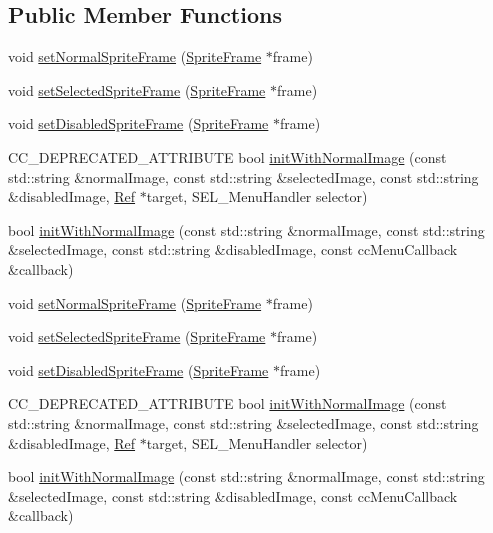 \subsection*{Public Member Functions}
\begin{DoxyCompactItemize}
\item 
void \hyperlink{classMenuItemImage_ac85fee9b02f2199a96d52ddf14a1ae89}{set\+Normal\+Sprite\+Frame} (\hyperlink{classSpriteFrame}{Sprite\+Frame} $\ast$frame)
\item 
void \hyperlink{classMenuItemImage_a574ca5c9be7143cda3403ba3174aa249}{set\+Selected\+Sprite\+Frame} (\hyperlink{classSpriteFrame}{Sprite\+Frame} $\ast$frame)
\item 
void \hyperlink{classMenuItemImage_a3ca7c47c67c831ff698eecf4e7e7ce86}{set\+Disabled\+Sprite\+Frame} (\hyperlink{classSpriteFrame}{Sprite\+Frame} $\ast$frame)
\item 
C\+C\+\_\+\+D\+E\+P\+R\+E\+C\+A\+T\+E\+D\+\_\+\+A\+T\+T\+R\+I\+B\+U\+TE bool \hyperlink{classMenuItemImage_a9b48219252d0b4c138b9bda8c1d812c4}{init\+With\+Normal\+Image} (const std\+::string \&normal\+Image, const std\+::string \&selected\+Image, const std\+::string \&disabled\+Image, \hyperlink{classRef}{Ref} $\ast$target, S\+E\+L\+\_\+\+Menu\+Handler selector)
\item 
bool \hyperlink{classMenuItemImage_af0e4ddc4163e789101bab744c1ba62da}{init\+With\+Normal\+Image} (const std\+::string \&normal\+Image, const std\+::string \&selected\+Image, const std\+::string \&disabled\+Image, const cc\+Menu\+Callback \&callback)
\item 
void \hyperlink{classMenuItemImage_ac85fee9b02f2199a96d52ddf14a1ae89}{set\+Normal\+Sprite\+Frame} (\hyperlink{classSpriteFrame}{Sprite\+Frame} $\ast$frame)
\item 
void \hyperlink{classMenuItemImage_a574ca5c9be7143cda3403ba3174aa249}{set\+Selected\+Sprite\+Frame} (\hyperlink{classSpriteFrame}{Sprite\+Frame} $\ast$frame)
\item 
void \hyperlink{classMenuItemImage_a3ca7c47c67c831ff698eecf4e7e7ce86}{set\+Disabled\+Sprite\+Frame} (\hyperlink{classSpriteFrame}{Sprite\+Frame} $\ast$frame)
\item 
C\+C\+\_\+\+D\+E\+P\+R\+E\+C\+A\+T\+E\+D\+\_\+\+A\+T\+T\+R\+I\+B\+U\+TE bool \hyperlink{classMenuItemImage_a1676374a1960c737c5bca1411ea66b4e}{init\+With\+Normal\+Image} (const std\+::string \&normal\+Image, const std\+::string \&selected\+Image, const std\+::string \&disabled\+Image, \hyperlink{classRef}{Ref} $\ast$target, S\+E\+L\+\_\+\+Menu\+Handler selector)
\item 
bool \hyperlink{classMenuItemImage_af0e4ddc4163e789101bab744c1ba62da}{init\+With\+Normal\+Image} (const std\+::string \&normal\+Image, const std\+::string \&selected\+Image, const std\+::string \&disabled\+Image, const cc\+Menu\+Callback \&callback)
\end{DoxyCompactItemize}
